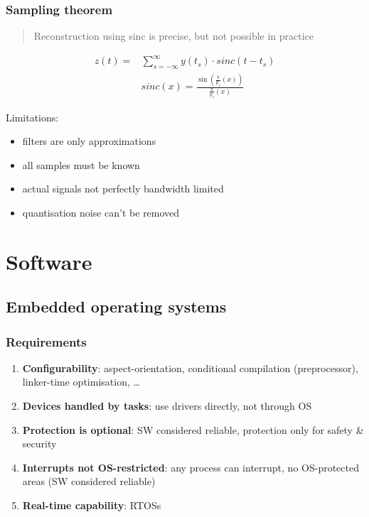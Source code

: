 \documentclass{article}
\begin{document}
\subsubsection{Sampling theorem}
\begin{quote}Reconstruction using sinc is precise, but not possible in practice\end{quote}

\begin{align*}
  z(t)    = & \sum_{s=-\infty}^{\infty} y(t_s) \cdot sinc(t-t_s)            \\
            & sinc(x) = \frac{\sin(\frac{\pi}{p_s}(x))}{\frac{\pi}{p_s}(x)}
\end{align*}

Limitations:
\begin{itemize}
  \item filters are only approximations
  \item all samples must be known
  \item actual signals not perfectly bandwidth limited
  \item quantisation noise can't be removed
\end{itemize}



\section{Software}

\subsection{Embedded operating systems}

\subsubsection{Requirements}
\begin{enumerate}
  \item \textbf{Configurability}: aspect-orientation, conditional compilation (preprocessor), linker-time optimisation, …
  \item \textbf{Devices handled by tasks}: use drivers directly, not through OS
  \item \textbf{Protection is optional}: SW considered reliable, protection only for safety \& security
  \item \textbf{Interrupts not OS-restricted}: any process can interrupt, no OS-protected areas (SW considered reliable)
  \item \textbf{Real-time capability}: RTOSs
\end{enumerate}
\end{document}
